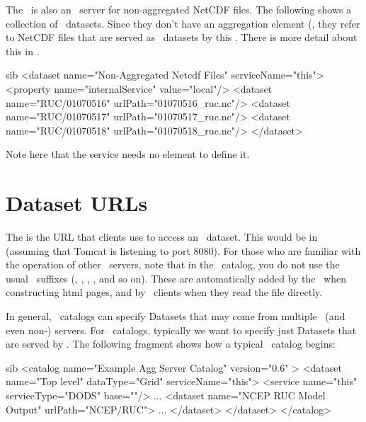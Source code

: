 \documentclass{dods-book}
\begin{document}
The \aggser\ is also an \opendap\ server for non-aggregated NetCDF
files. The following shows a collection of \opendap\ datasets. Since
they don't have an aggregation  element
(, they refer to
NetCDF files that are served as \opendap\ datasets by this \aggser .
There is more detail about this in .

\begin{vcode}{sib}
<dataset name="Non-Aggregated Netcdf Files" serviceName="this">
   <property name="internalService" value="local"/>
   <dataset name="RUC/01070516" urlPath="01070516_ruc.nc"/>
   <dataset name="RUC/01070517" urlPath="01070517_ruc.nc"/>
   <dataset name="RUC/01070518" urlPath="01070518_ruc.nc"/>
 </dataset>
\end{vcode}

Note here that the  service needs no 
element to define it.

\section{Dataset URLs}
\label{agg,dataseturls}

The is the URL that clients use to access an \aggser\ 
dataset.  This would be  in
\exampleref{ex3} (assuming that Tomcat is listening to port 8080).
For those who are familiar with the operation of other \opendap\ 
servers, note that in the \aggser\ catalog, you do not use the usual
\opendap\ suffixes (\lit{.dds}, \lit{.das}, \lit{.info}, ,
and so on). These are automatically added by the \aggser\ when
constructing html pages, and by \thredds\ clients when they read the
\lit{catalog.xml} file directly.

In general, \thredds\ catalogs can specify Datasets that may come from
multiple \opendap\ (and even non-\opendap ) servers. For \aggser\ 
catalogs, typically we want to specify just Datasets that are served
by \lit{this} \aggser . The following fragment shows how a typical
\aggser\ catalog begins:

\examplelabel{ex4}
\begin{vcode}{sib}
<catalog name="Example Agg Server Catalog" version="0.6" >
<dataset name="Top level" dataType="Grid" serviceName="this">
  <service name="this" serviceType="DODS" base=""/>
     ...
    <dataset name="NCEP RUC Model Output" urlPath="NCEP/RUC">
    ...
    </dataset>
</dataset>
</catalog>
\end{vcode}
\end{document}
